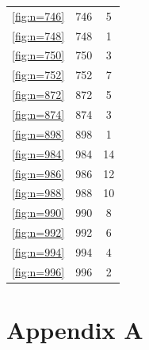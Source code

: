 \documentclass[pdftex,a4paper]{scrartcl}
\begin{document}
\begin{table}
\begin{tabular}{c c c}
        \ref{fig:n=746} & 746 & 5 \\
        \ref{fig:n=748} & 748 & 1 \\
        \ref{fig:n=750} & 750 & 3 \\
        \ref{fig:n=752} & 752 & 7 \\
        \ref{fig:n=872} & 872 & 5 \\
        \ref{fig:n=874} & 874 & 3 \\
        \ref{fig:n=898} & 898 & 1 \\
        \ref{fig:n=984} & 984 & 14 \\
        \ref{fig:n=986} & 986 & 12 \\
        \ref{fig:n=988} & 988 & 10 \\
        \ref{fig:n=990} & 990 & 8 \\
        \ref{fig:n=992} & 992 & 6 \\
        \ref{fig:n=994} & 994 & 4 \\
        \ref{fig:n=996} & 996 & 2 \\
    \end{tabular}
    \label{tab:macro}
\end{table}


\section{Appendix A}\label{app:A}

\end{document}
